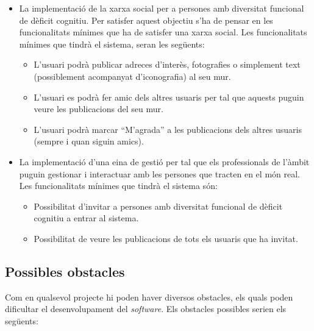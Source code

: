 \documentclass[11pt,catalan,listoffigures,listoftables]{tfgetsinf}
\begin{document}
\begin{itemize}
	\item La implementació de la xarxa social per a persones amb diversitat funcional de dèficit cognitiu. Per satisfer aquest objectiu s’ha de pensar en les funcionalitats mínimes que ha de satisfer una xarxa social. Les funcionalitats mínimes que tindrà el sistema, seran les següents:
	\begin{itemize}
		\item L’usuari podrà publicar adreces d’interès, fotografies o simplement text (possiblement acompanyat d’iconografia) al seu mur.
		\item L’usuari es podrà fer amic dels altres usuaris per tal que aquests puguin veure les publicacions del seu mur.
		\item L’usuari podrà marcar “M’agrada” a les publicacions dels altres usuaris (sempre i quan siguin amics).
	\end{itemize}
	\item La implementació d’una eina de gestió per tal que els professionals de l’àmbit puguin gestionar i interactuar amb les persones que tracten en el món real. Les funcionalitats mínimes que tindrà el sistema són:
	\begin{itemize}
		\item Possibilitat d’invitar a persones amb diversitat funcional de dèficit cognitiu a entrar al sistema.
		\item Possibilitat de veure les publicacions de tots els usuaris que ha invitat.
	\end{itemize}
\end{itemize}

\subsection{Possibles obstacles}

Com en qualsevol projecte hi poden haver diversos obstacles, els quals poden dificultar el desenvolupament del \textit{software}. Els obstacles possibles serien els següents:
\end{document}

